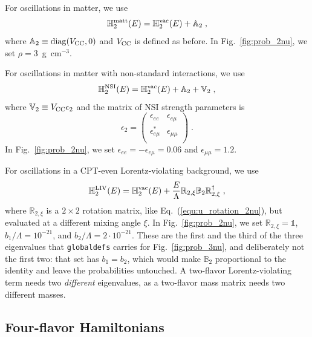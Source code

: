 \documentclass[final,5p,times,twocolumn,sort,compress]{elsarticle}
\newcommand{\eq}{Eq.}
\newcommand{\fig}{Fig.}
\newcommand{\equ}[1]{\eq~(\ref{equ:#1})}
\newcommand{\figu}[1]{\fig~\ref{fig:#1}}
\begin{document}
For oscillations in matter, we use
\begin{equation}
 \mathbb{H}_2^{\rm matt}(E) 
 = 
 \mathbb{H}_2^{\rm vac}(E)  + \mathbb{A}_2 \;,
\end{equation}
where $\mathbb{A}_2 \equiv {\rm diag}(V_{\rm CC}, 0)$ and $V_{\rm CC}$ is defined as before.  In \figu{prob_2nu}, we set $\rho = 3$~g~cm$^{-3}$.

For oscillations in matter with non-standard interactions, we use
\begin{equation}
 \mathbb{H}_2^{\rm NSI}(E) 
 = 
 \mathbb{H}_2^{\rm vac}(E) + \mathbb{A}_2 + \mathbb{V}_2 \;,
\end{equation}
where $\mathbb{V}_2 \equiv V_{\rm CC} \epsilon_2$ and the matrix of NSI strength parameters is
\begin{equation}
 \epsilon_2
 =
 \left(
  \begin{array}{cc}
   \epsilon_{ee}         & \epsilon_{e\mu}         \\
   \epsilon_{e\mu}^\ast  & \epsilon_{\mu\mu}       \\
  \end{array}
 \right) \;.
\end{equation}
In \figu{prob_2nu}, we set $\epsilon_{ee} = -\epsilon_{e\mu} = 0.06$ and $\epsilon_{\mu\mu} = 1.2$.

For oscillations in a CPT-even Lorentz-violating background, we use
\begin{equation}
 \mathbb{H}_2^{\rm LIV}(E) 
 = 
 \mathbb{H}_2^{\rm vac}(E) + \frac{E}{\Lambda} \mathbb{R}_{2,\xi} \mathbb{B}_2 \mathbb{R}_{2,\xi}^\dagger \;,
\end{equation}
where $\mathbb{R}_{2,\xi}$ is a $2 \times 2$ rotation matrix, like \equ{u_rotation_2nu}, but evaluated at a different mixing angle $\xi$.  In \figu{prob_2nu}, we set $\mathbb{R}_{2,\xi} = \mathbb{1}$, $b_1/\Lambda = 10^{-21}$, and $b_2/\Lambda = 2 \cdot 10^{-21}$.  These are the first and the third of the three eigenvalues that {\tt globaldefs} carries for \figu{prob_3nu}, and deliberately not the first two: that set has $b_1 = b_2$, which would make $\mathbb{B}_2$ proportional to the identity and leave the probabilities untouched.  A two-flavor Lorentz-violating term needs two \emph{different} eigenvalues, as a two-flavor mass matrix needs two different masses.


\subsection{Four-flavor Hamiltonians}
\end{document}
